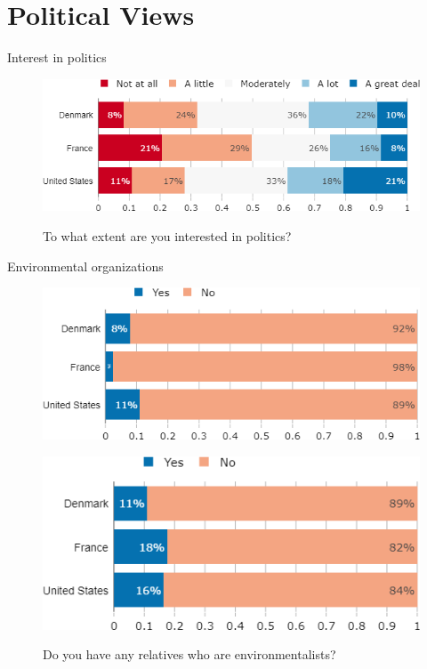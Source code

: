 \documentclass[aspectratio=169,9pt,dvipsnames]{beamer}
\begin{document}
\section{Political Views}

\begin{frame}{Interest in politics }%
\vspace{-.5cm}
\begin{figure}[h!]
\caption{To what extent are you interested in politics?}
\includegraphics[width=.6\textwidth]{../figures/country_comparison/interested_politics_countries.png} \\
\end{figure}
\end{frame}

\begin{frame}{Environmental organizations}%
\vspace{-.5cm}
\begin{figure}[h!]
\caption{Are you member of an environmental organization?}
\includegraphics[width=.45\textwidth]{../figures/country_comparison/member_environmental_orga_countries.png}\\
\vspace{.1cm}
\caption{Do you have any relatives who are environmentalists?}
\includegraphics[width=.45\textwidth]{../figures/country_comparison/relative_environmentalist_countries.png}\\
\end{figure}
\end{frame}
\end{document}
